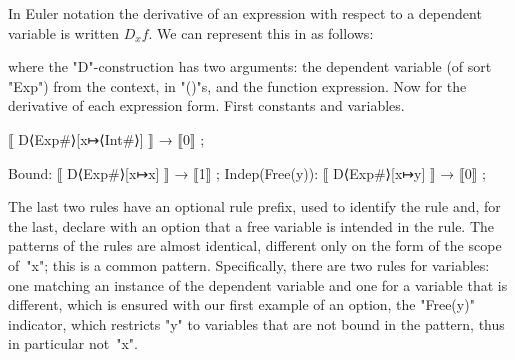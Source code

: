 \documentclass[11pt]{article} %
\begin{document}
\begin{example}\label{ex:deriv5}
  
  In Euler notation the derivative of an expression with respect to a dependent variable is written
  $D_xf$. We can represent this in \HAX as follows:
  where the "D"-construction has two arguments: the dependent variable (of sort "Exp") from the
  context, in "()"s, and the function expression.
%
%
  Now for the derivative of each expression form.  First constants and variables.
\begin{code}[firstnumber=last]
⟦ D⟨Exp#⟩[x↦⟨Int#⟩] ⟧ → ⟦0⟧ ;

Bound:          ⟦ D⟨Exp#⟩[x↦x] ⟧ → ⟦1⟧ ;
Indep(Free(y)): ⟦ D⟨Exp#⟩[x↦y] ⟧ → ⟦0⟧ ;
\end{code}
  The last two rules have an optional rule prefix, used to identify the rule and, for the last,
  declare with an option that a free variable is intended in the rule.
  The patterns of the rules are almost identical, different only on the form of the scope of~"x";
  this is a common pattern. Specifically, there are two rules for variables: one matching an
  instance of the dependent variable and one for a variable that is different, which is ensured with
  our first example of an option, the "Free(y)" indicator, which restricts "y" to variables that are
  not bound in the pattern, thus in particular not~"x".


\end{example}
\end{document}
